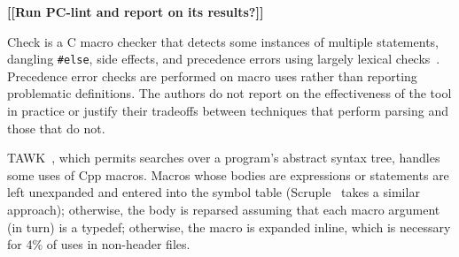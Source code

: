 \documentclass[10pt]{article}
\newcommand{\comment}[1]{\textbf{[[#1]]}}
\begin{document}
\comment{Run PC-lint and report on its results?}




Check is a C macro checker that detects some instances of multiple
statements, dangling {\tt \#else}, side effects, and precedence errors
using largely lexical checks~\cite{SpulerS92}.  Precedence error checks are
performed on macro uses rather than reporting problematic definitions.  The
authors do not report on the effectiveness of the tool in practice or
justify their tradeoffs between techniques that perform parsing and those
that do not.

TAWK~\cite{GriswoldAM96}, which permits searches over a program's abstract
syntax tree, handles some uses of Cpp macros.  Macros whose bodies are
expressions or statements are left unexpanded and entered into the symbol
table (Scruple~\cite{PaulP94} takes a similar approach); otherwise, the
body is reparsed assuming that each macro argument (in turn) is a typedef;
otherwise, the macro is expanded inline, which is necessary for 4\% of uses
in non-header files.
\end{document}
